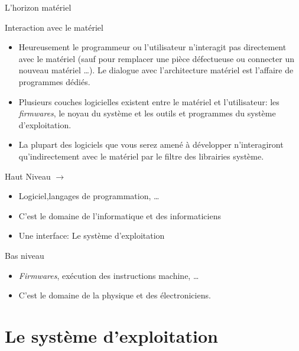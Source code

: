 \begin{frame}{L'horizon matériel}
  \begin{block}{Interaction avec le matériel}
    \begin{itemize}
    \item Heureusement le programmeur ou l'utilisateur n'interagit pas
      directement avec le matériel (sauf pour remplacer une pièce
      défectueuse ou connecter un nouveau matériel \dots). Le dialogue
      avec l'architecture matériel est l'affaire de programmes dédiés.
    \item Plusieurs couches logicielles existent entre le matériel et
      l'utilisateur: les \textit{firmwares}, le noyau du système et les
      outils et programmes du système d'exploitation.
    \item La plupart des logiciels que vous serez amené à développer
      n'interagiront qu'indirectement avec le matériel par le filtre des
      librairies système.
    \end{itemize}
  \end{block}
  \begin{alertblock}{Haut Niveau $\rightarrow$}
    \begin{itemize}
    \item Logiciel,langages de programmation, \dots
    \item[\dialoginformation] C'est le domaine de l'informatique et des
      informaticiens
    \item[\dialogsystem] Une interface: Le système d'exploitation
    \end{itemize}
  \end{alertblock}
  \begin{alertblock}{Bas niveau}
    \begin{itemize}
    \item \textit{Firmwares}, exécution des instructions machine, \dots
    \item C'est le domaine de la physique et des électroniciens.
    \end{itemize}
  \end{alertblock}
\end{frame}


\section{Le système d'exploitation}
